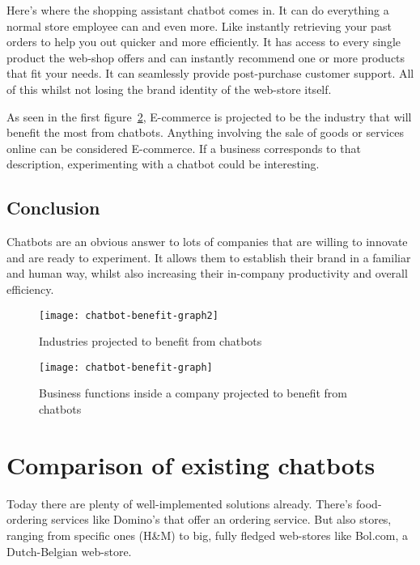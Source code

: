 Here's where the shopping assistant chatbot comes in. It can do everything a normal store employee can and even more. Like instantly retrieving your past orders to help you out quicker and more efficiently. It has access to every single product the web-shop offers and can instantly recommend one or more products that fit your needs. It can seamlessly provide post-purchase customer support. All of this whilst not losing the brand identity of the web-store itself.

As seen in the first figure~\ref{fig:chatbot-benefit-graph}, E-commerce is projected to be the industry that will benefit the most from chatbots. Anything involving the sale of goods or services online can be considered E-commerce. If a business corresponds to that description, experimenting with a chatbot could be interesting.

\subsection{Conclusion}

Chatbots are an obvious answer to lots of companies that are willing to innovate and are ready to experiment. It allows them to establish their brand in a familiar and human way, whilst also increasing their in-company productivity and overall efficiency.

\begin{figure}[p]
	\centering
	\texttt{[image: chatbot-benefit-graph2]}\label{fig:chatbot-benefit-graph2}
	\caption{Industries projected to benefit from chatbots~\cite{chatbot-industry-benefits}}
\end{figure}

\begin{figure}[p]
	\centering
	\texttt{[image: chatbot-benefit-graph]}\label{fig:chatbot-benefit-graph}
	\caption{Business functions inside a company projected to benefit from chatbots~\cite{chatbot-industry-benefits}}
\end{figure}

\newpage

\section{Comparison of existing chatbots}

Today there are plenty of well-implemented solutions already. There's food-ordering services like Domino's that offer an ordering service. But also stores, ranging from specific ones (H\&M) to big, fully fledged web-stores like Bol.com, a Dutch-Belgian web-store.

